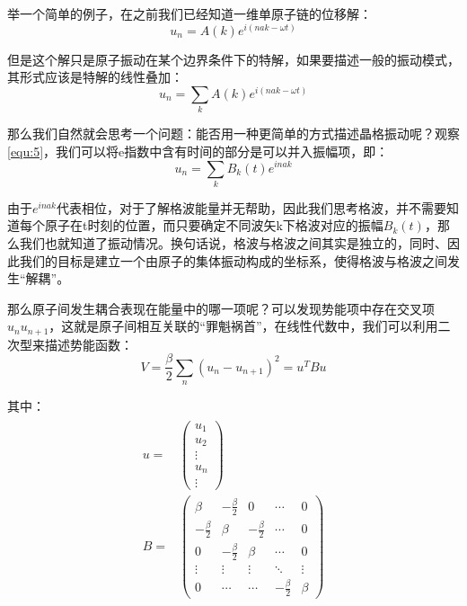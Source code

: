 \documentclass{ctexart}
\begin{document}
            举一个简单的例子，在之前我们已经知道一维单原子链的位移解：
            \begin{equation}
                u_n=A(k)e^{i(nak-\omega t)}
            \end{equation}
            
            但是这个解只是原子振动在某个边界条件下的特解，如果要描述一般的振动模式，其形式应该是特解的线性叠加：
            \begin{equation}\label{equ:5}
                u_n=\sum_k A(k)e^{i(nak-\omega t)}
            \end{equation}
    
            那么我们自然就会思考一个问题：能否用一种更简单的方式描述晶格振动呢？观察\eqref{equ:5}，我们可以将e指数中含有时间的部分是可以并入振幅项，即：
            \begin{equation}
                u_n=\sum_k B_k(t)e^{inak}
            \end{equation}
            
            由于$e^{inak}$代表相位，对于了解格波能量并无帮助，因此我们思考格波，并不需要知道每个原子在t时刻的位置，而只要确定不同波矢k下格波对应的振幅$B_k(t)$，那么我们也就知道了振动情况。换句话说，格波与格波之间其实是独立的，同时、因此我们的目标是建立一个由原子的集体振动构成的坐标系，使得格波与格波之间发生“解耦”。
            
            那么原子间发生耦合表现在能量中的哪一项呢？可以发现势能项中存在交叉项$u_nu_{n+1}$，这就是原子间相互关联的“罪魁祸首”，在线性代数中，我们可以利用二次型来描述势能函数：
            \begin{equation}
                V=\frac{\beta}{2}\sum_{n}(u_n-u_{n+1})^2=u^TBu
            \end{equation}
    
            其中：
            \begin{align}
                \begin{split}
                    u=&\begin{pmatrix}
                         u_1\\
                         u_2\\
                         \vdots\\
                         u_n\\
                         \vdots
                    \end{pmatrix}\\
                    B=&\begin{pmatrix}
                        \beta & -\frac{\beta}{2} & 0 & \cdots & 0\\
                        -\frac{\beta}{2} & \beta & -\frac{\beta}{2} & \cdots & 0\\
                        0 & -\frac{\beta}{2} & \beta & \cdots & 0\\
                        \vdots & \vdots & \vdots & \ddots & \vdots\\
                        0 & \cdots & \cdots & -\frac{\beta}{2} & \beta 
                    \end{pmatrix}
                \end{split}
            \end{align}
            
\end{document}
